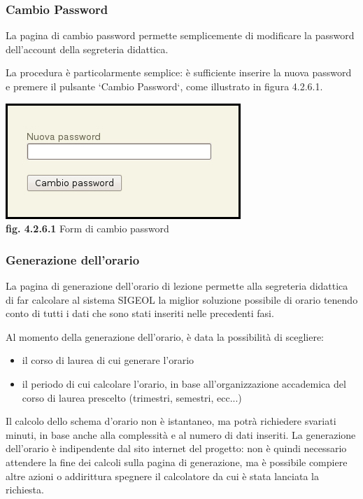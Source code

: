 \documentclass[11pt,a4paper]{article}
\begin{document}
\subsubsection{Cambio Password}
La pagina di cambio password permette semplicemente di modificare la password dell'account della segreteria didattica.

La procedura è particolarmente semplice: è sufficiente inserire la nuova password e premere il pulsante `Cambio Password`, come illustrato in figura 4.2.6.1.

\begin{center}
	\includegraphics[scale=0.5]{images/cambio_password.jpg}\\
	\textbf{fig. 4.2.6.1} Form di cambio password\\
\end{center}

\subsubsection{Generazione dell'orario}
La pagina di generazione dell'orario di lezione permette alla segreteria didattica di far calcolare al sistema SIGEOL la miglior soluzione possibile di orario tenendo conto di tutti i dati che sono stati inseriti nelle precedenti fasi.

Al momento della generazione dell'orario, è data la possibilità di scegliere:
\begin{itemize}
 \item il corso di laurea di cui generare l'orario
 \item il periodo di cui calcolare l'orario, in base all'organizzazione accademica del corso di laurea prescelto (trimestri, semestri, ecc...)
\end{itemize}
Il calcolo dello schema d'orario non è istantaneo, ma potrà richiedere svariati minuti, in base anche alla complessità e al numero di dati inseriti.
La generazione dell'orario è indipendente dal sito internet del progetto: non è quindi necessario attendere la fine dei calcoli sulla pagina di generazione, ma è possibile compiere altre azioni o addirittura spegnere il calcolatore da cui è stata lanciata la richiesta.
\end{document}

